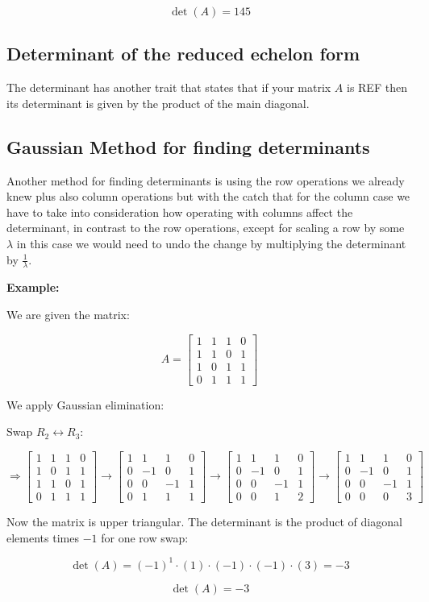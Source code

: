 \[
    \det(A) = 145
\]

\subsection{Determinant of the reduced echelon form}

The determinant has another trait that states that if your matrix \(A\) is REF then
its determinant is given by the product of the main diagonal. 

\subsection{Gaussian Method for finding determinants}

Another method for finding determinants is using the row operations we already knew plus also column operations 
but with the catch that for the column case we have to take into consideration how
operating with columns affect the determinant, in contrast to the row operations, except for scaling
a row by some \(\lambda\) in this case we would need to undo the change by multiplying the determinant
by \(\frac{1}{\lambda}\).

\textbf{Example: }

We are given the matrix:

\[
    A = \begin{bmatrix}
    1 & 1 & 1 & 0 \\
    1 & 1 & 0 & 1 \\
    1 & 0 & 1 & 1 \\
    0 & 1 & 1 & 1
    \end{bmatrix}
\]

We apply Gaussian elimination:

Swap \( R_2 \leftrightarrow R_3 \):

\[
    \Rightarrow
    \begin{bmatrix}
    1 & 1 & 1 & 0 \\
    1 & 0 & 1 & 1 \\
    1 & 1 & 0 & 1 \\
    0 & 1 & 1 & 1
    \end{bmatrix}
    \rightarrow
    \begin{bmatrix}
    1 & 1 & 1 & 0 \\
    0 & -1 & 0 & 1 \\
    0 & 0 & -1 & 1 \\
    0 & 1 & 1 & 1
    \end{bmatrix}
    \rightarrow
    \begin{bmatrix}
    1 & 1 & 1 & 0 \\
    0 & -1 & 0 & 1 \\
    0 & 0 & -1 & 1 \\
    0 & 0 & 1 & 2
    \end{bmatrix}
    \rightarrow
    \begin{bmatrix}
    1 & 1 & 1 & 0 \\
    0 & -1 & 0 & 1 \\
    0 & 0 & -1 & 1 \\
    0 & 0 & 0 & 3
    \end{bmatrix}
\]

Now the matrix is upper triangular. The determinant is the product of diagonal elements times \( -1 \) for one row swap:

\[
    \det(A) = {(-1)}^1 \cdot (1) \cdot (-1) \cdot (-1) \cdot (3) = -3
\]

\[
    \det(A) = -3
\]

